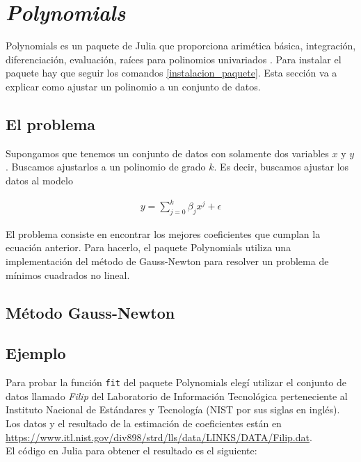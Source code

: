 \chapter{\textit{Polynomials}}

Polynomials es un paquete de Julia que proporciona arimética básica, integración, diferenciación, evaluación, raíces para polinomios univariados \cite{poly_manual}. Para instalar el paquete hay que seguir los comandos \ref{instalacion_paquete}. Esta sección va a explicar como ajustar un polinomio a un conjunto de datos. 

\section{El problema}
Supongamos que tenemos un conjunto de datos con solamente dos variables $x$ y $y$. Buscamos ajustarlos a un polinomio de grado $k$. Es decir, buscamos ajustar los datos al modelo

\begin{equation} \label{eq_polinomio}
    \begin{aligned}
    y = \sum_{j = 0}^{k} \beta_j x^j + \epsilon
    \end{aligned}
\end{equation}

El problema consiste en encontrar los mejores coeficientes que cumplan la ecuación anterior. Para hacerlo, el paquete Polynomials utiliza una implementación del método de Gauss-Newton para resolver un problema de mínimos cuadrados no lineal. 


\section{Método Gauss-Newton}



\section{Ejemplo}
Para probar la función \texttt{fit} del paquete Polynomials elegí utilizar el conjunto de datos llamado \textit{Filip} del Laboratorio de Información Tecnológica perteneciente al Instituto Nacional de Estándares y Tecnología (NIST por sus siglas en inglés). Los datos y el resultado de la estimación de coeficientes están en \url{https://www.itl.nist.gov/div898/strd/lls/data/LINKS/DATA/Filip.dat}. 
\\
El código en Julia para obtener el resultado es el siguiente: 

